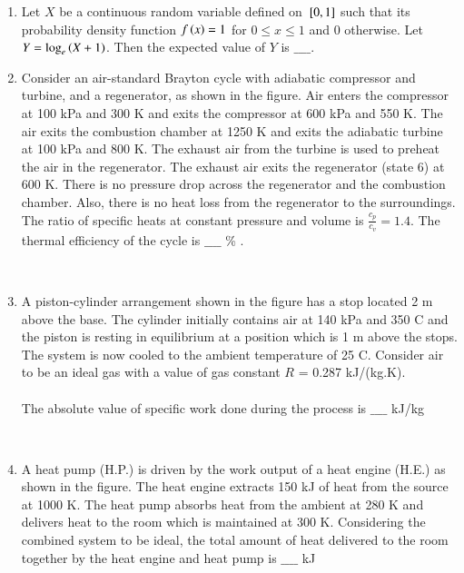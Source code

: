 \documentclass[journal]{IEEEtran}
\begin{document}
\begin{enumerate}
\item Let $X$ be a continuous random variable defined on ${}\left[0,1\right]$ such that its probability density function $f\left(x\right) = 1$ for $0 \leq x \leq 1$ and 0 otherwise. Let $Y = \log_e\left(X + 1\right)$. Then the expected value of $Y$ is $\_\_\_\_$.  \\
\item Consider an air-standard Brayton cycle with adiabatic compressor and turbine, and a regenerator, as shown in the figure. Air enters the compressor at 100 kPa and 300 K and exits the compressor at 600 kPa and 550 K. The air exits the combustion chamber at 1250 K and exits the adiabatic turbine at 100 kPa and 800 K. The exhaust air from the turbine is used to preheat the air in the regenerator. The exhaust air exits the regenerator (state 6) at 600 K. There is no pressure drop across the regenerator and the combustion chamber. Also, there is no heat loss from the regenerator to the surroundings. The ratio of specific heats at constant pressure and volume is $\frac{c_p}{c_v} =
1.4$. The thermal efficiency of the cycle is $\_\_\_\_$ \% .
\begin{figure}[!ht]
\centering
\resizebox{0.9\textwidth}{!}{%

}%
\end{figure}\\
\item A piston-cylinder arrangement shown in the figure has a stop located 2 m above the base. The cylinder initially contains air at 140 kPa and 350 \degree C and the piston is resting in equilibrium at a position which is 1 m above the stops. The system is now cooled to the ambient temperature of 25 \degree C. Consider air to be an ideal gas with a value of gas constant $R$ = 0.287 kJ/(kg.K). \\\\
The absolute value of specific work done during the process is $\_\_\_\_$ kJ/kg
\begin{figure}[!ht]
\centering
\resizebox{0.5\textwidth}{!}{%

}%
\end{figure}\\
\item A heat pump (H.P.) is driven by the work output of a heat engine (H.E.) as shown in the figure. The heat engine extracts 150 kJ of heat from the source at 1000 K. The heat pump absorbs heat from the ambient at 280 K and delivers heat to the room which is maintained at 300 K. Considering the combined system to be ideal, the total amount of heat delivered to the room together by the heat engine and heat pump is $\_\_\_\_$ kJ 

\end{enumerate}
\end{document}
